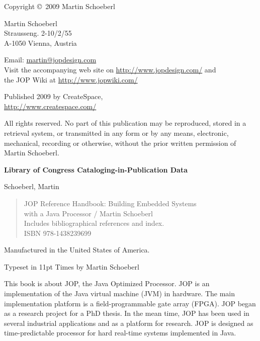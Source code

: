 \thispagestyle{empty}
\begin{flushleft}
{\small

Copyright \copyright \ 2009 Martin Schoeberl
\medskip

Martin Schoeberl\\
Strausseng. 2-10/2/55\\
A-1050 Vienna, Austria\\
\medskip

Email: \url{martin@jopdesign.com}\\
Visit the accompanying web site on \url{http://www.jopdesign.com/}
and\\
the JOP Wiki at \url{http://www.jopwiki.com/}
\medskip

Published 2009 by CreateSpace,\\
\url{http://www.createspace.com/}



\medskip


All rights reserved. No part of this publication may be reproduced,
stored in a retrieval system, or transmitted in any form or by any
means, electronic, mechanical, recording or otherwise, without the
prior written permission of Martin Schoeberl.
\medskip


\textbf{Library of Congress Cataloging-in-Publication Data}
\medskip

Schoeberl, Martin
\begin{quote}
    JOP Reference Handbook: Building Embedded Systems\\
    with a Java Processor / Martin Schoeberl\\
    Includes bibliographical references and index.\\
    ISBN 978-1438239699
\end{quote}

\bigskip


Manufactured in the United States of America.

Typeset in 11pt Times by Martin Schoeberl}
\end{flushleft}




This book is about JOP, the Java Optimized Processor. JOP is an
implementation of the Java virtual machine (JVM) in hardware. The
main implementation platform is a field-programmable gate array
(FPGA). JOP began as a research project for a PhD thesis. In the mean
time, JOP has been used in several industrial applications and as a
platform for research. JOP is designed as time-predictable processor
for hard real-time systems implemented in Java.

